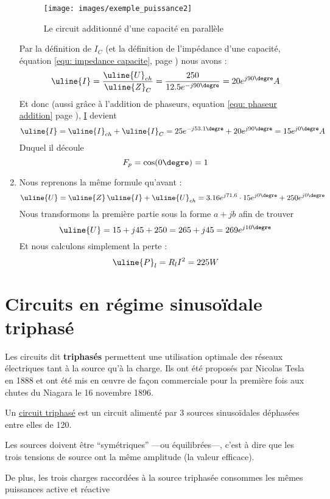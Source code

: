 \documentclass[12pt,a4paper]{article}
\newcommand{\uz}{\uline{Z} }
\newcommand{\ui}{\uline{I} }
\newcommand{\uu}{\uline{U} }
\newcommand{\up}{\uline{P} }
\begin{document}
\begin{enumerate}[label=\alph*)]
			\begin{figure}[!h]
				\centering
				\texttt{[image: images/exemple\_puissance2]}
				\caption{Le circuit additionné d'une capacité en parallèle}
				\label{fig: exemple puissance2}
			\end{figure}
			Par la définition de $I_C$ (et la définition de l'impédance d'une capacité, équation \ref{equ: impedance capacite}, page \pageref{equ: impedance capacite}) nous avons :
			\[\ui = \frac{\uu_{ch}}{\uz_C} = \frac{250}{12.5e^{-j90\degre}} = 20e^{j90\degre} A\]
			Et donc (aussi grâce à l'addition de phaseurs, equation \ref{equ: phaseur addition} page \pageref{equ: phaseur addition}), \ui devient 
			\[\ui = \ui_{ch} + \ui_C = 25e^{-j53.1\degre} + 20e^{j90\degre} = 15e^{j0\degre} A\]
			Duquel il découle 
			\[F_p = \cos(0\degre) = 1\]
	\item 	Nous reprenons la même formule qu'avant :
			\[\uu = \uz\, \ui + \uu_{ch} = 3.16e^{j71,6} \cdot 15e^{j0\degre} + 250e^{j0\degre}\]
			Nous transformons la première partie sous la forme $a+jb$ afin de trouver
			\[\uu = 15+ j45 + 250 = 265 + j45 = 269e^{j10\degre}\]
			Et nous calculons simplement la perte :
			\[\up_l = R_l I^2 = 225 W\]
\end{enumerate}




\section[Régime sinusoïdale triphasé]{Circuits en régime sinusoïdale triphasé}
Les circuits dit \textbf{triphasés} permettent une utilisation optimale des réseaux électriques tant à la source qu'à la charge. Ils ont été proposés par Nicolas Tesla en 1888 et ont été mis en \oe uvre de façon commerciale pour la première fois aux chutes du Niagara le 16 novembre 1896.

\begin{blackbox}
	 Un \uline{circuit triphasé} est un circuit alimenté par 3 sources sinusoïdales déphasées entre elles de 120\degre. 
	
	Les sources doivent être ``symétriques'' ---ou équilibrées---, c'est à dire que les trois tensions de source ont la même amplitude (la valeur efficace). 
	
	De plus, les trois charges raccordées à la source triphasée consommes les mêmes puissances active et réactive
\end{blackbox}
\end{document}
